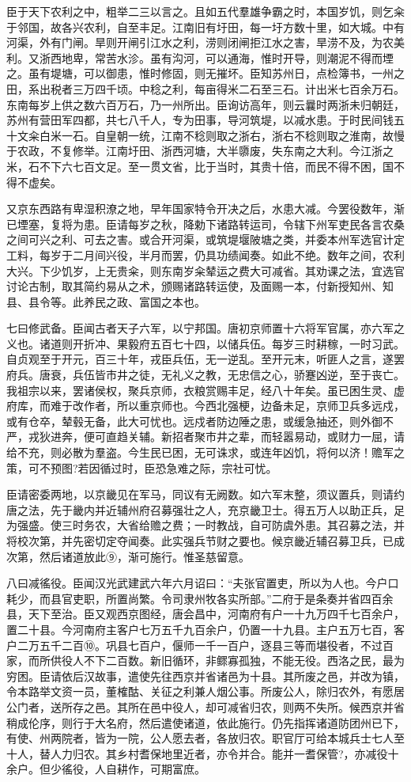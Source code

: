 \documentclass[UTF8,titlepage,oneside]{ctexbook}
\begin{document}
臣于天下农利之中，粗举二三以言之。且如五代羣雄争霸之时，本国岁饥，则乞籴于邻国，故各兴农利，自至丰足。江南旧有圩田，每一圩方数十里，如大城。中有河渠，外有门闸。旱则开闸引江水之利，涝则闭闸拒江水之害，旱涝不及，为农美利。又浙西地卑，常苦水沴。虽有沟河，可以通海，惟时开导，则潮泥不得而堙之。虽有堤塘，可以御患，惟时修固，则无摧坏。臣知苏州日，点检簿书，一州之田，系出税者三万四千顷。中稔之利，每亩得米二石至三石。计出米七百余万石。东南每岁上供之数六百万石，乃一州所出。臣询访高年，则云曩时两浙未归朝廷，苏州有营田军四都，共七八千人，专为田事，导河筑堤，以减水患。于时民间钱五十文籴白米一石。自皇朝一统，江南不稔则取之浙右，浙右不稔则取之淮南，故慢于农政，不复修举。江南圩田、浙西河塘，大半隳废，失东南之大利。今江浙之米，石不下六七百文足。至一贯文省，比于当时，其贵十倍，而民不得不困，国不得不虚矣。


又京东西路有卑湿积潦之地，早年国家特令开决之后，水患大减。今罢役数年，渐已堙塞，复将为患。臣请每岁之秋，降勅下诸路转运司，令辖下州军吏民各言农桑之间可兴之利、可去之害。或合开河渠，或筑堤堰陂塘之类，并委本州军选官计定工料，每岁于二月间兴役，半月而罢，仍具功绩闻奏。如此不绝。数年之间，农利大兴。下少饥岁，上无贵籴，则东南岁籴辇运之费大可减省。其劝课之法，宜选官讨论古制，取其简约易从之术，颁赐诸路转运使，及面赐一本，付新授知州、知县、县令等。此养民之政、富国之本也。


七曰修武备。臣闻古者天子六军，以宁邦国。唐初京师置十六将军官属，亦六军之义也。诸道则开折冲、果毅府五百七十四，以储兵伍。每岁三时耕稼，一时习武。自贞观至于开元，百三十年，戎臣兵伍，无一逆乱。至开元末，听匪人之言，遂罢府兵。唐衰，兵伍皆市井之徒，无礼义之教，无忠信之心，骄蹇凶逆，至于丧亡。我祖宗以来，罢诸侯权，聚兵京师，衣粮赏赐丰足，经八十年矣。虽已困生灵、虚府库，而难于改作者，所以重京师也。今西北强梗，边备未足，京师卫兵多远戍，或有仓卒，辇毂无备，此大可忧也。远戍者防边陲之患，或缓急抽还，则外御不严，戎狄进奔，便可直趋关辅。新招者聚市井之辈，而轻嚣易动，或财力一屈，请给不充，则必散为羣盗。今生民已困，无可诛求，或连年凶饥，将何以济！赡军之策，可不预图?若因循过时，臣恐急难之际，宗社可忧。


臣请密委两地，以京畿见在军马，同议有无阙数。如六军末整，须议置兵，则请约唐之法，先于畿内并近辅州府召募强壮之人，充京畿卫士。得五万人以助正兵，足为强盛。使三时务农，大省给赡之费；一时教战，自可防虞外患。其召募之法，并将校次第，并先密切定夺闻奏。此实强兵节财之要也。候京畿近辅召募卫兵，已成次第，然后诸道放此⑨，渐可施行。惟圣慈留意。


八曰减徭役。臣闻汉光武建武六年六月诏曰：“夫张官置吏，所以为人也。今户口耗少，而县官吏职，所置尚繁。令司隶州牧各实所部。”二府于是条奏并省四百余县，天下至治。臣又观西京图经，唐会昌中，河南府有户一十九万四千七百余户，置二十县。今河南府主客户七万五千九百余户，仍置一十九县。主户五万七百，客户二万五千二百⑩。巩县七百户，偃师一千一百户，逐县三等而堪役者，不过百家，而所供役人不下二百数。新旧循环，非鳏寡孤独，不能无役。西洛之民，最为穷困。臣请依后汉故事，遣使先往西京并省诸邑为十县。其所废之邑，并改为镇，令本路举文资一员，董榷酤、关征之利兼人烟公事。所废公人，除归农外，有愿居公门者，送所存之邑。其所在邑中役人，却可减省归农，则两不失所。候西京并省稍成伦序，则行于大名府，然后遣使诸道，依此施行。仍先指挥诸道防团州已下，有使、州两院者，皆为一院，公人愿去者，各放归农。职官厅可给本城兵士七人至十人，替人力归农。其乡村耆保地里近者，亦令并合。能并一耆保管?，亦减役十余户。但少徭役，人自耕作，可期富庶。
\end{document}
